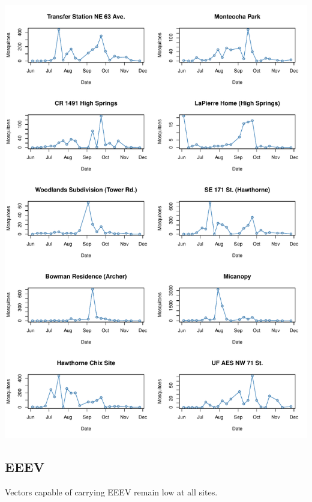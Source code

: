 \documentclass{article}
\begin{document}
\begin{center}
\includegraphics{mosq08nov13-009}

\newpage
\subsection*{EEEV}

\end{center}

Vectors capable of carrying EEEV remain low at all sites.\\
\end{document}
